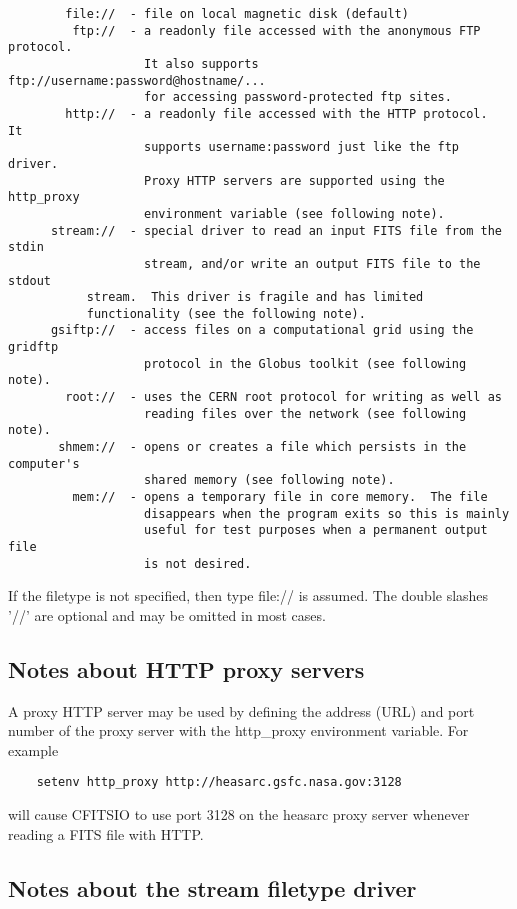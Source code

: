 \documentclass[11pt]{book}
\begin{document}
\begin{verbatim}
        file://  - file on local magnetic disk (default)
         ftp://  - a readonly file accessed with the anonymous FTP protocol.
                   It also supports  ftp://username:password@hostname/...
                   for accessing password-protected ftp sites.
        http://  - a readonly file accessed with the HTTP protocol.  It
                   supports username:password just like the ftp driver.
                   Proxy HTTP servers are supported using the http_proxy
                   environment variable (see following note).
      stream://  - special driver to read an input FITS file from the stdin
                   stream, and/or write an output FITS file to the stdout
		   stream.  This driver is fragile and has limited
		   functionality (see the following note).
      gsiftp://  - access files on a computational grid using the gridftp
                   protocol in the Globus toolkit (see following note).
        root://  - uses the CERN root protocol for writing as well as
                   reading files over the network (see following note).
       shmem://  - opens or creates a file which persists in the computer's
                   shared memory (see following note).
         mem://  - opens a temporary file in core memory.  The file
                   disappears when the program exits so this is mainly
                   useful for test purposes when a permanent output file
                   is not desired.
\end{verbatim}
If the filetype is not specified, then type file:// is assumed.
The double slashes '//' are optional and may be omitted in most cases.


\subsection{Notes about HTTP proxy servers}

A proxy HTTP server may be used by defining the address (URL) and port
number of the proxy server with the http\_proxy environment variable.
For example

\begin{verbatim}
    setenv http_proxy http://heasarc.gsfc.nasa.gov:3128
\end{verbatim}
will cause CFITSIO to use port 3128 on the heasarc proxy server whenever
reading a FITS file with HTTP.


\subsection{Notes about the stream filetype driver}
\end{document}
